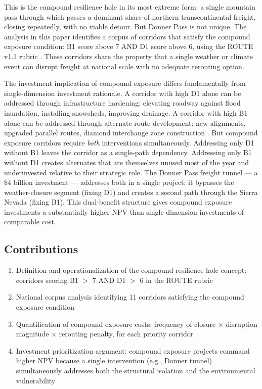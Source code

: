 This is the compound resilience hole in its most extreme form: a single mountain pass through which passes a dominant share of northern transcontinental freight, closing repeatedly, with no viable detour. But Donner Pass is not unique. The analysis in this paper identifies a corpus of corridors that satisfy the compound exposure condition: B1 score above 7 AND D1 score above 6, using the ROUTE v1.1 rubric \citep{ROUTE_A2}. These corridors share the property that a single weather or climate event can disrupt freight at national scale with no adequate rerouting option.

The investment implication of compound exposure differs fundamentally from single-dimension investment rationale. A corridor with high D1 alone can be addressed through infrastructure hardening: elevating roadway against flood inundation, installing snowsheds, improving drainage. A corridor with high B1 alone can be addressed through alternate route development: new alignments, upgraded parallel routes, diamond interchange zone construction \citep{ROUTE_B4}. But compound exposure corridors require \textit{both} interventions simultaneously. Addressing only D1 without B1 leaves the corridor as a single-path dependency. Addressing only B1 without D1 creates alternates that are themselves unused most of the year and underinvested relative to their strategic role. The Donner Pass freight tunnel --- a \$4 billion investment --- addresses both in a single project: it bypasses the weather-closure segment (fixing D1) and creates a second path through the Sierra Nevada (fixing B1). This dual-benefit structure gives compound exposure investments a substantially higher NPV than single-dimension investments of comparable cost.

\subsection*{Contributions}

\begin{enumerate}
\item Definition and operationalization of the compound resilience hole concept: corridors scoring B1 $>$ 7 AND D1 $>$ 6 in the ROUTE rubric
\item National corpus analysis identifying 11 corridors satisfying the compound exposure condition
\item Quantification of compound exposure costs: frequency of closure $\times$ disruption magnitude $\times$ rerouting penalty, for each priority corridor
\item Investment prioritization argument: compound exposure projects command higher NPV because a single intervention (e.g., Donner tunnel) simultaneously addresses both the structural isolation and the environmental vulnerability
\end{enumerate}
